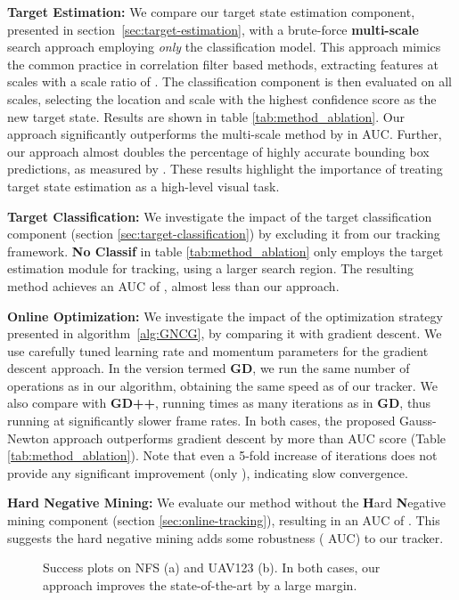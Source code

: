 \documentclass[10pt,twocolumn,letterpaper]{article}
\newcommand{\parsection}[1]{\noindent\textbf{#1:} }
\begin{document}
\parsection{Target Estimation}
We compare our target state estimation component, presented in section~\ref{sec:target-estimation}, with a brute-force \textbf{multi-scale} search approach employing \emph{only} the classification model. This approach mimics the common practice in correlation filter based methods, extracting features at  scales with a scale ratio of . The classification component is then evaluated on all scales, selecting the location and scale with the highest confidence score as the new target state. Results are shown in table \ref{tab:method_ablation}. Our approach significantly outperforms the multi-scale method by  in AUC. Further, our approach almost doubles the percentage of highly accurate bounding box predictions, as measured by . These results highlight the importance of treating target state estimation as a high-level visual task. 


\parsection{Target Classification}
We investigate the impact of the target classification component (section \ref{sec:target-classification}) by excluding it from our tracking framework. 
\textbf{No Classif} in table \ref{tab:method_ablation} only employs the target estimation module for tracking, using a larger search region. The resulting method achieves an AUC of , almost  less than our approach.


\parsection{Online Optimization}
We investigate the impact of the optimization strategy presented in algorithm~\ref{alg:GNCG}, by comparing it with gradient descent. We use carefully tuned learning rate and momentum parameters for the gradient descent approach. In the version termed \textbf{GD}, we run the same number of  operations as in our algorithm, obtaining the same speed as of our tracker. We also compare with \textbf{GD++}, running  times as many iterations as in \textbf{GD}, thus running at significantly slower frame rates. In both cases, the proposed Gauss-Newton approach outperforms gradient descent by more than  AUC score (Table \ref{tab:method_ablation}). Note that even a 5-fold increase of iterations does not provide any significant improvement (only ), indicating slow convergence.

\parsection{Hard Negative Mining} We evaluate our method without the \textbf{H}ard \textbf{N}egative mining component (section \ref{sec:online-tracking}), resulting in an AUC of . This suggests the hard negative mining adds some robustness ( AUC) to our tracker.


\begin{figure}[t]
	\newcommand{\wid}{0.5\columnwidth}\centering\vspace{-5mm}\caption{Success plots on NFS (a) and UAV123 (b). In both cases, our approach improves the state-of-the-art by a large margin.}\label{fig:sotanfsuav}\vspace{-1mm}
\end{figure}
\end{document}

